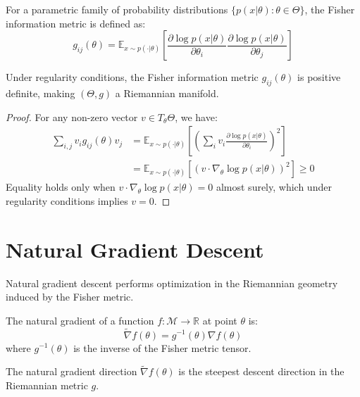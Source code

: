 \begin{definition}
\label{def:fisher_metric}
For a parametric family of probability distributions $\{p(x|\theta) : \theta \in \Theta\}$, the Fisher information metric is defined as:
$$g_{ij}(\theta) = \mathbb{E}_{x \sim p(\cdot|\theta)} \left[ \frac{\partial \log p(x|\theta)}{\partial \theta_i} \frac{\partial \log p(x|\theta)}{\partial \theta_j} \right]$$
\end{definition}

\begin{theorem}
\label{thm:fisher_positive_definite}
Under regularity conditions, the Fisher information metric $g_{ij}(\theta)$ is positive definite, making $(\Theta, g)$ a Riemannian manifold.
\end{theorem}

\begin{proof}
For any non-zero vector $v \in T_\theta \Theta$, we have:
\begin{align}
\sum_{i,j} v_i g_{ij}(\theta) v_j &= \mathbb{E}_{x \sim p(\cdot|\theta)} \left[ \left(\sum_i v_i \frac{\partial \log p(x|\theta)}{\partial \theta_i}\right)^2 \right] \\
&= \mathbb{E}_{x \sim p(\cdot|\theta)} \left[ (v \cdot \nabla_\theta \log p(x|\theta))^2 \right] \geq 0
\end{align}
Equality holds only when $v \cdot \nabla_\theta \log p(x|\theta) = 0$ almost surely, which under regularity conditions implies $v = 0$.
\end{proof}

\section{Natural Gradient Descent}

Natural gradient descent performs optimization in the Riemannian geometry induced by the Fisher metric.

\begin{definition}
\label{def:natural_gradient}
The natural gradient of a function $f: \mathcal{M} \to \mathbb{R}$ at point $\theta$ is:
$$\tilde{\nabla} f(\theta) = g^{-1}(\theta) \nabla f(\theta)$$
where $g^{-1}(\theta)$ is the inverse of the Fisher metric tensor.
\end{definition}

\begin{theorem}
\label{thm:steepest_descent}
The natural gradient direction $\tilde{\nabla} f(\theta)$ is the steepest descent direction in the Riemannian metric $g$.
\end{theorem}

